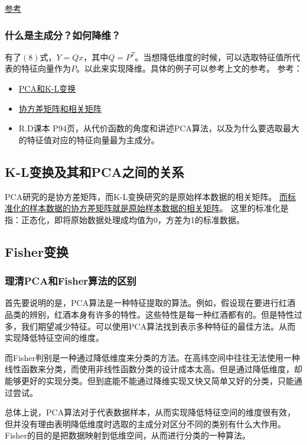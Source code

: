 \documentclass[12pt, letterpaper]{article}
\begin{document}
\href{https://seanlee97.github.io/2018/03/29/从特征值特征向量去理解PCA/}{参考}
\subsubsection*{什么是主成分？如何降维？}
有了$(8)$式，$Y=Qx$，其中$Q=P^T$。当想降低维度的时候，可以选取特征值所代表的特征向量作为$P$。以此来实现降维。具体的例子可以参考上文的参考。
参考：
\begin{itemize}
\item 
\href{https://blog.csdn.net/OldMonkeyYu_s/article/details/45766543}{PCA和K-L变换}
\item 
\href{https://blog.csdn.net/animaldww/article/details/5642923}{协方差矩阵和相关矩阵}
\item R.D课本 P94页，从代价函数的角度和讲述PCA算法，以及为什么要选取最大的特征值对应的特征向量最为主成分。
\end{itemize}

\subsection{K-L变换及其和PCA之间的关系}
PCA研究的是协方差矩阵，而K-L变换研究的是原始样本数据的相关矩阵。
\underline{而标准化的样本数据的协方差矩阵就是原始样本数据的相关矩阵}。
这里的标准化是指：正态化，即将原始数据处理成均值为0，方差为1的标准数据。


\subsection{Fisher变换}
\subsubsection*{理清PCA和Fisher算法的区别}
首先要说明的是，PCA算法是一种特征提取的算法。例如，假设现在要进行红酒品类的辨别，红酒本身有许多的特性。这些特性是每一种红酒都有的。但是特性过多，我们期望减少特征。可以使用PCA算法找到表示多种特征的最佳方法。从而实现降低特征空间的维度。

而Fisher判别是一种通过降低维度来分类的方法。在高纬空间中往往无法使用一种线性函数来分类，而使用非线性函数分类的设计成本太高。但是通过降低维度，却能够更好的实现分类。但到底能不能通过降维实现又快又简单又好的分类，只能通过尝试。

总体上说，PCA算法对于代表数据样本，从而实现降低特征空间的维度很有效，但并没有理由表明降低维度时选取的主成分对区分不同的类别有什么大作用。Fisher的目的是把数据映射到低维空间，从而进行分类的一种算法。
\end{document}
